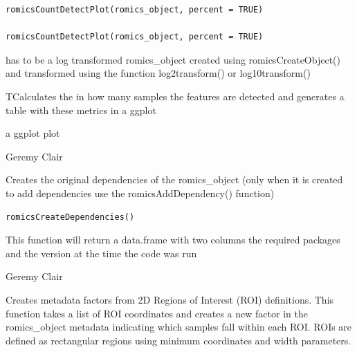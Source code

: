 \documentclass[a4paper]{book}
\begin{document}
%
\begin{Usage}
\begin{verbatim}
romicsCountDetectPlot(romics_object, percent = TRUE)

romicsCountDetectPlot(romics_object, percent = TRUE)
\end{verbatim}
\end{Usage}
%
\begin{Arguments}
\begin{ldescription}
\item[\code{romics\_object}] has to be a log transformed romics\_object created using romicsCreateObject() and transformed using the function log2transform() or log10transform()
\end{ldescription}
\end{Arguments}
%
\begin{Details}
TCalculates the in how many samples the features are detected and generates a table with these metrics in a ggplot
\end{Details}
%
\begin{Value}
a ggplot plot
\end{Value}
%
\begin{Author}
Geremy Clair
\end{Author}
%
\begin{Description}
Creates the original dependencies of the romics\_object (only when it is created to add dependencies use the romicsAddDependency() function)
\end{Description}
%
\begin{Usage}
\begin{verbatim}
romicsCreateDependencies()
\end{verbatim}
\end{Usage}
%
\begin{Value}
This function will return a data.frame with two columns the required packages and the version at the time the code was run
\end{Value}
%
\begin{Author}
Geremy Clair
\end{Author}
%
\begin{Description}
Creates metadata factors from 2D Regions of Interest (ROI) definitions.
This function takes a list of ROI coordinates and creates a new factor in the romics\_object metadata
indicating which samples fall within each ROI. ROIs are defined as rectangular regions using
minimum coordinates and width parameters.
\end{Description}
\end{document}
